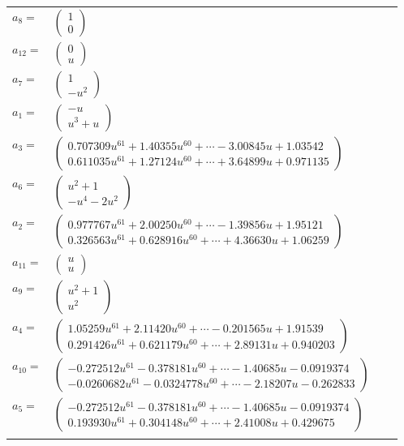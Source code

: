 \documentclass[1p]{elsarticle_modified}
\theoremstyle{definition}
\begin{document}
\begin{tabular}{m{7pt} m{180pt} m{7pt} m{180pt} }
\flushright $a_{8}=$&$\begin{pmatrix}1\\0\end{pmatrix}$ \\
\flushright $a_{12}=$&$\begin{pmatrix}0\\u\end{pmatrix}$ \\
\flushright $a_{7}=$&$\begin{pmatrix}1\\- u^2\end{pmatrix}$ \\
\flushright $a_{1}=$&$\begin{pmatrix}- u\\u^3+u\end{pmatrix}$ \\
\flushright $a_{3}=$&$\begin{pmatrix}0.707309 u^{61}+1.40355 u^{60}+\cdots-3.00845 u+1.03542\\0.611035 u^{61}+1.27124 u^{60}+\cdots+3.64899 u+0.971135\end{pmatrix}$ \\
\flushright $a_{6}=$&$\begin{pmatrix}u^2+1\\- u^4-2 u^2\end{pmatrix}$ \\
\flushright $a_{2}=$&$\begin{pmatrix}0.977767 u^{61}+2.00250 u^{60}+\cdots-1.39856 u+1.95121\\0.326563 u^{61}+0.628916 u^{60}+\cdots+4.36630 u+1.06259\end{pmatrix}$ \\
\flushright $a_{11}=$&$\begin{pmatrix}u\\u\end{pmatrix}$ \\
\flushright $a_{9}=$&$\begin{pmatrix}u^2+1\\u^2\end{pmatrix}$ \\
\flushright $a_{4}=$&$\begin{pmatrix}1.05259 u^{61}+2.11420 u^{60}+\cdots-0.201565 u+1.91539\\0.291426 u^{61}+0.621179 u^{60}+\cdots+2.89131 u+0.940203\end{pmatrix}$ \\
\flushright $a_{10}=$&$\begin{pmatrix}-0.272512 u^{61}-0.378181 u^{60}+\cdots-1.40685 u-0.0919374\\-0.0260682 u^{61}-0.0324778 u^{60}+\cdots-2.18207 u-0.262833\end{pmatrix}$ \\
\flushright $a_{5}=$&$\begin{pmatrix}-0.272512 u^{61}-0.378181 u^{60}+\cdots-1.40685 u-0.0919374\\0.193930 u^{61}+0.304148 u^{60}+\cdots+2.41008 u+0.429675\end{pmatrix}$\\&\end{tabular}
\end{document}
